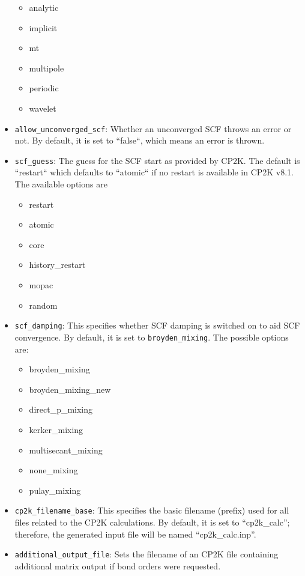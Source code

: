 \documentclass[]{tufte-book}
\begin{document}
\begin{itemize}
        \begin{itemize}
		\item analytic
		\item implicit
		\item mt
		\item multipole
		\item periodic
		\item wavelet
        \end{itemize}
	\item \texttt{allow\_unconverged\_scf}: Whether an unconverged SCF throws an error or not. By default, it is set to ``false``, which means an error is thrown.
	\item \texttt{scf\_guess}: The guess for the SCF start as provided by \textsc{CP2K}. The default is ``restart`` which defaults to ``atomic`` if no restart is available in \textsc{CP2K} v8.1. The available options are
        \begin{itemize}
		\item restart
		\item atomic
		\item core
		\item history\_restart
		\item mopac
		\item random
        \end{itemize}
	\item \texttt{scf\_damping}: This specifies whether SCF damping is switched on to aid SCF convergence. By default, it is set to \texttt{broyden\_mixing}. The possible options are:
        \begin{itemize}
 		\item broyden\_mixing
                \item broyden\_mixing\_new
                \item direct\_p\_mixing
                \item kerker\_mixing
                \item multisecant\_mixing
                \item none\_mixing
                \item pulay\_mixing
        \end{itemize}
	\item \texttt{cp2k\_filename\_base}: This specifies the basic filename (prefix) used for all files related to the \textsc{CP2K} calculations.
	By default, it is set to ``cp2k\_calc''; therefore, the generated input file will be named ``cp2k\_calc.inp''.
	\item \texttt{additional\_output\_file}: Sets the filename of an \textsc{CP2K} file containing additional matrix output if bond orders were requested.

\end{itemize}
\end{document}
